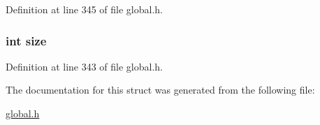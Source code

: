 Definition at line 345 of file global.\-h.

\hypertarget{struct__octHeap_a439227feff9d7f55384e8780cfc2eb82}{
\subsubsection[{size}]{\setlength{\rightskip}{0pt plus 5cm}int size}}\label{struct__octHeap_a439227feff9d7f55384e8780cfc2eb82}


Definition at line 343 of file global.\-h.



The documentation for this struct was generated from the following file\-:\begin{DoxyCompactItemize}
\item 
\hyperlink{global_8h}{global.\-h}\end{DoxyCompactItemize}
